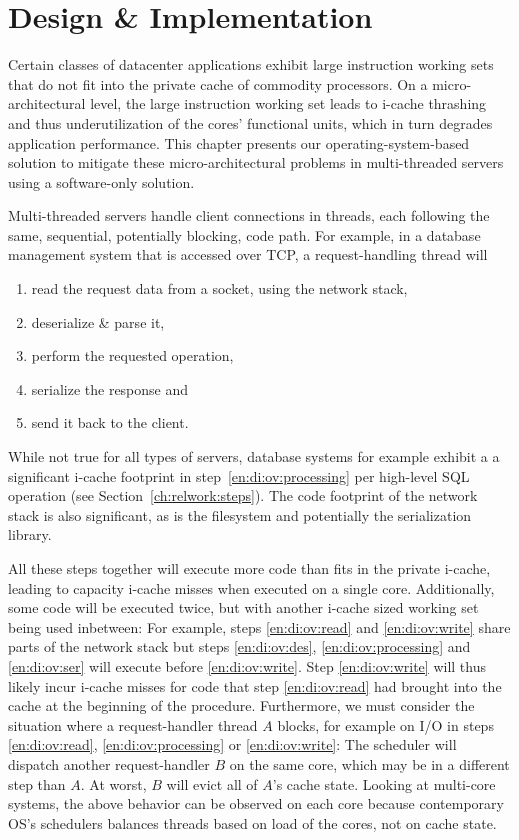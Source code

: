 \documentclass[12pt,a4paper]{book}
\begin{document}
\chapter{Design \& Implementation}\label{ch:di}
Certain classes of datacenter applications exhibit large instruction working sets that do not fit into the private cache of commodity processors.
On a micro-architectural level, the large instruction working set leads to i-cache thrashing and thus underutilization of the cores' functional units, which in turn degrades application performance.
This chapter presents our operating-system-based solution to mitigate these micro-architectural problems in multi-threaded servers using a software-only solution.

Multi-threaded servers handle client connections in threads, each following the same, sequential, potentially blocking, code path.
For example, in a database management system that is accessed over TCP, a request-handling thread will
\begin{enumerate}[label=(\alph*)]
    \item read the request data from a socket, using the network stack, \label{en:di:ov:read}
    \item deserialize \& parse it, \label{en:di:ov:des}
    \item perform the requested operation,\label{en:di:ov:processing}
    \item serialize the response and \label{en:di:ov:ser}
    \item send it back to  the client. \label{en:di:ov:write}
\end{enumerate}
While not true for all types of servers, database systems for example exhibit a a significant i-cache footprint in step~\ref{en:di:ov:processing} per high-level SQL operation (see Section~\ref{ch:relwork:steps}).
The code footprint of the network stack is also significant, as is the filesystem and potentially the serialization library.

All these steps together will execute more code than fits in the private i-cache, leading to capacity i-cache misses when executed on a single core.
Additionally, some code will be executed twice, but with another i-cache sized working set being used inbetween:
For example, steps \ref{en:di:ov:read} and \ref{en:di:ov:write} share parts of the network stack but steps \ref{en:di:ov:des}, \ref{en:di:ov:processing} and \ref{en:di:ov:ser} will execute before \ref{en:di:ov:write}.
Step \ref{en:di:ov:write} will thus likely incur i-cache misses for code that step \ref{en:di:ov:read} had brought into the cache at the beginning of the procedure.
Furthermore, we must consider the situation where a request-handler thread $A$ blocks, for example on I/O in steps \ref{en:di:ov:read}, \ref{en:di:ov:processing} or \ref{en:di:ov:write}:
The scheduler will dispatch another request-handler $B$ on the same core, which may be in a different step than $A$.
At worst, $B$ will evict all of $A$'s cache state.
Looking at multi-core systems, the above behavior can be observed on each core because contemporary OS's schedulers balances threads based on load of the cores, not on cache state.
\end{document}
